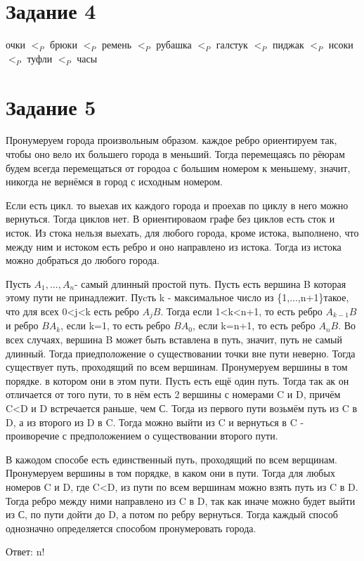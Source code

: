 \documentclass[a4paper, 12pt]{article}
\renewcommand{\d}{$}
\begin{document}
	\section*{Задание 4}
		очки $<_P$ брюки $<_P$ ремень $<_P$ рубашка $<_P$ галстук $<_P$ пиджак $<_P$ нсоки $<_P$ туфли $<_P$ часы
	\section*{Задание 5}
		Пронумеруем города произвольным образом. каждое ребро ориентируем так, чтобы оно вело их большего города в меньший. Тогда перемещаясь по рёюрам будем всегда перемещаться от городоа с большим номером к меньшему, значит, никогда не вернёмся в город с исходным номером.

		Если есть цикл. то выехав их каждого города и проехав по циклу в него можно вернуться. Тогда циклов нет. В ориентироваом графе без циклов есть сток и исток. Из стока нельзя выехать, для любого города, кроме истока, выполнено, что между ним и истоком есть ребро и оно направлено из истока. Тогда из истока можно добраться до любого города.

		Пусть \d A_1,...,A_n \d - самый длинный простой путь. Пусть есть вершина B которая этому пути не принадлежит. Пуcть k - максимальное число из \{1,...,n+1\}такое, что для всех 0<j<k есть ребро $A_jB$. Тогда если 1<k<n+1, то есть ребро $A_{k-1}B$ и ребро $BA_{k}$, если k=1, то есть ребро $BA_0$, если k=n+1, то есть ребро $A_nB$. Во всех случаях, вершина B может быть вставлена в путь, значит, путь не самый длинный. Тогда приедположение о существовании точки вне пути неверно. Тогда существует путь, проходящий по всем вершинам. Пронумеруем вершины в том порядке. в котором они в этом пути. Пусть есть ещё один путь. Тогда так ак он отличается от того пути, то в нём есть 2 вершины с номерами C и D, причём C<D и D встречается раньше, чем С. Тогда из первого пути возьмём путь из C в D, а из второго из D в C. Тогда можно выйти из C и вернуться в C - проиворечие с предположением о существовании второго пути.

		В кажодом способе есть единственный путь, проходящий по всем верщинам. Пронумеруем вершины в том порядке, в каком они в пути. Тогда для любых номеров C и D, где C<D, из пути по всем вершинам можно взять путь из C в D. Тогда ребро между ними направлено из C в D, так как иначе можно будет выйти из С, по пути дойти до D, а потом по ребру вернуться. Тогда каждый способ однозначно определяется способом пронумеровать города. 

		Ответ: n!
\end{document}
